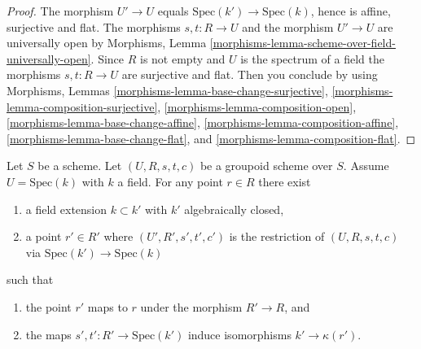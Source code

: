 \begin{proof}
The morphism $U' \to U$ equals $\text{Spec}(k') \to \text{Spec}(k)$,
hence is affine, surjective and flat. The morphisms $s, t : R \to U$
and the morphism $U' \to U$ are universally open by
Morphisms, Lemma \ref{morphisms-lemma-scheme-over-field-universally-open}.
Since $R$ is not empty and $U$ is the spectrum of a field the morphisms
$s, t : R \to U$ are surjective and flat. Then you conclude by using
Morphisms, Lemmas \ref{morphisms-lemma-base-change-surjective},
\ref{morphisms-lemma-composition-surjective},
\ref{morphisms-lemma-composition-open},
\ref{morphisms-lemma-base-change-affine},
\ref{morphisms-lemma-composition-affine},
\ref{morphisms-lemma-base-change-flat}, and
\ref{morphisms-lemma-composition-flat}.
\end{proof}

\begin{lemma}
\label{lemma-groupoid-on-field-explain-points}
Let $S$ be a scheme. Let $(U, R, s, t, c)$ be a groupoid scheme
over $S$. Assume $U = \text{Spec}(k)$ with $k$ a field.
For any point $r \in R$ there exist
\begin{enumerate}
\item a field extension $k \subset k'$ with $k'$ algebraically closed,
\item a point $r' \in R'$ where $(U', R', s', t', c')$ is the
restriction of $(U, R, s, t, c)$ via $\text{Spec}(k') \to \text{Spec}(k)$
\end{enumerate}
such that
\begin{enumerate}
\item the point $r'$ maps to $r$ under the morphism $R' \to R$, and
\item the maps $s', t' : R' \to \text{Spec}(k')$ induce isomorphisms
$k' \to \kappa(r')$.
\end{enumerate}
\end{lemma}

